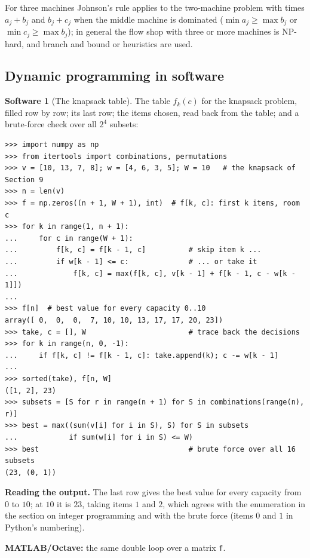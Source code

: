 \documentclass[11pt,a4paper]{article}
\numberwithin{equation}{section}
\theoremstyle{definition}
\newtheorem{software}[thm]{Software}
\begin{document}
For three machines Johnson's rule applies to the two-machine problem with times $a_j + b_j$ and $b_j + c_j$ when the middle machine is dominated ($\min a_j \geq \max b_j$ or $\min c_j \geq \max b_j$); in general the flow shop with three or more machines is NP-hard, and branch and bound or heuristics are used.

\subsection{Dynamic programming in software}
\label{ssec:software11}

\begin{software}[The knapsack table]
\label{sw:knapsack}
The table $f_k(c)$ for the knapsack problem, filled row by row; its last row; the items chosen, read back from the table; and a brute-force check over all $2^4$ subsets:
{\small\begin{verbatim}
>>> import numpy as np
>>> from itertools import combinations, permutations
>>> v = [10, 13, 7, 8]; w = [4, 6, 3, 5]; W = 10   # the knapsack of Section 9
>>> n = len(v)
>>> f = np.zeros((n + 1, W + 1), int)  # f[k, c]: first k items, room c
>>> for k in range(1, n + 1):
...     for c in range(W + 1):
...         f[k, c] = f[k - 1, c]          # skip item k ...
...         if w[k - 1] <= c:              # ... or take it
...             f[k, c] = max(f[k, c], v[k - 1] + f[k - 1, c - w[k - 1]])
...
>>> f[n]  # best value for every capacity 0..10
array([ 0,  0,  0,  7, 10, 10, 13, 17, 17, 20, 23])
>>> take, c = [], W                        # trace back the decisions
>>> for k in range(n, 0, -1):
...     if f[k, c] != f[k - 1, c]: take.append(k); c -= w[k - 1]
...
>>> sorted(take), f[n, W]
([1, 2], 23)
>>> subsets = [S for r in range(n + 1) for S in combinations(range(n), r)]
>>> best = max((sum(v[i] for i in S), S) for S in subsets
...            if sum(w[i] for i in S) <= W)
>>> best                                   # brute force over all 16 subsets
(23, (0, 1))
\end{verbatim}}
\textbf{Reading the output.} The last row gives the best value for every capacity from $0$ to $10$; at $10$ it is $23$, taking items $1$ and $2$, which agrees with the enumeration in the section on integer programming and with the brute force (items $0$ and $1$ in Python's numbering).

\textbf{MATLAB/Octave:} the same double loop over a matrix \texttt{f}.
\end{software}
\end{document}
